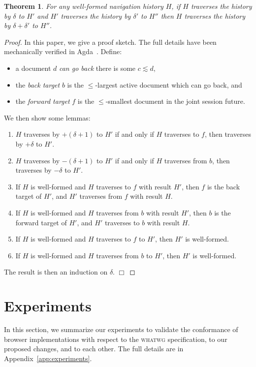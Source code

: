 \documentclass{notes}
\newcommand{\ltSess}{\lesssim}
\newtheorem{theorem}{Theorem}
\newcommand{\QED}{\hfill$\Box$}
\begin{document}
\begin{theorem}
\label{thm:fundamental}
  For any well-formed navigation history $H$,
  if $H$ traverses the history by $\delta$ to $H'$
  and $H'$ traverses the history by $\delta'$ to $H''$
  then $H$ traverses the history by $\delta+\delta'$ to $H''$.
\end{theorem}
\begin{proof}
  In this paper, we give a proof sketch. The full details have been mechanically verified in Agda~\cite{AgdaProofs}.
  Define:
  \begin{itemize}
  \item a document $d$ \emph{can go back} there is some $c \ltSess d$,
  \item the \emph{back target} $b$ is the $\le$-largest active document which can go back, and
  \item the \emph{forward target} $f$ is the $\le$-smallest document in the joint session future.
  \end{itemize}
  We then show some lemmas:
  \begin{enumerate}
  \item $H$ traverses by $+(\delta+1)$ to $H'$ if and only if
    $H$ traverses to $f$, then traverses by $+\delta$ to $H'$.
  \item $H$ traverses by $-(\delta+1)$ to $H'$ if and only if
    $H$ traverses from $b$, then traverses by $-\delta$ to $H'$.
  \item If $H$ is well-formed and $H$ traverses to $f$ with result $H'$,
    then $f$ is the back target of $H'$, and $H'$ traverses from $f$ with result $H$.
  \item If $H$ is well-formed and $H$ traverses from $b$ with result $H'$,
    then $b$ is the forward target of $H'$, and $H'$ traverses to $b$ with result $H$.
  \item If $H$ is well-formed and $H$ traverses to $f$ to $H'$, then $H'$ is well-formed.
  \item If $H$ is well-formed and $H$ traverses from $b$ to $H'$, then $H'$ is well-formed.
  \end{enumerate}
  The result is then an induction on $\delta$.
  \QED
\end{proof}

\section{Experiments}
\label{sec:experiments}

In this section, we summarize our experiments to validate the conformance of browser
implementations with respect to the \textsc{whatwg} specification, to our proposed
changes, and to each other. The full details are in Appendix~\ref{app:experiments}.
\end{document}
